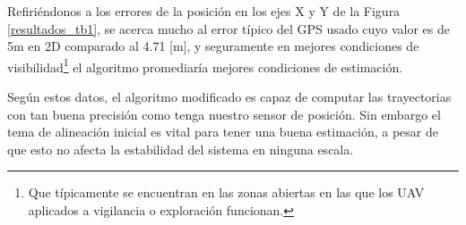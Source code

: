 \documentclass[conference]{IEEEtran}
\begin{document}
Refiriéndonos a los errores de la posición en los ejes X y Y de la Figura \ref{resultados_tb1}, se acerca mucho al error típico del GPS usado \cite{Mediatek2009} cuyo valor es de 5m en 2D comparado al 4.71 [m], y seguramente en mejores condiciones de visibilidad\footnote{Que típicamente se encuentran en las zonas abiertas en las que los UAV aplicados a vigilancia o exploración funcionan.} el algoritmo promediaría mejores condiciones de estimación.\par
Según estos datos, el algoritmo modificado es capaz de computar las trayectorias con tan buena precisión como tenga nuestro sensor de posición. Sin embargo el tema de alineación inicial es vital para tener una buena estimación, a pesar de que esto no afecta la estabilidad del sistema en ninguna escala.
%
%



%
%
\end{document}
